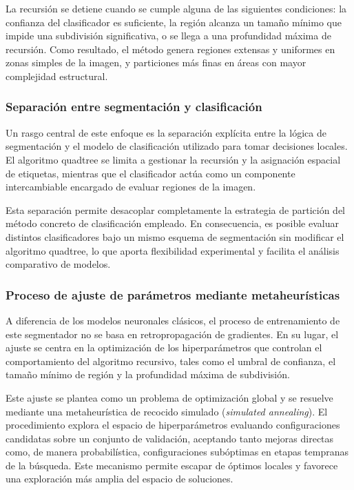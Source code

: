\documentclass[onecolumn, 12pt , journal]{IEEEtran}
\begin{document}
La recursión se detiene cuando se cumple alguna de las siguientes condiciones: la confianza del clasificador es suficiente, la región alcanza un tamaño mínimo que impide una subdivisión significativa, o se llega a una profundidad máxima de recursión. Como resultado, el método genera regiones extensas y uniformes en zonas simples de la imagen, y particiones más finas en áreas con mayor complejidad estructural.

\subsubsection{Separación entre segmentación y clasificación}

Un rasgo central de este enfoque es la separación explícita entre la lógica de segmentación y el modelo de clasificación utilizado para tomar decisiones locales. El algoritmo quadtree se limita a gestionar la recursión y la asignación espacial de etiquetas, mientras que el clasificador actúa como un componente intercambiable encargado de evaluar regiones de la imagen.

Esta separación permite desacoplar completamente la estrategia de partición del método concreto de clasificación empleado. En consecuencia, es posible evaluar distintos clasificadores bajo un mismo esquema de segmentación sin modificar el algoritmo quadtree, lo que aporta flexibilidad experimental y facilita el análisis comparativo de modelos.

\subsubsection{Proceso de ajuste de parámetros mediante metaheurísticas}

A diferencia de los modelos neuronales clásicos, el proceso de entrenamiento de este segmentador no se basa en retropropagación de gradientes. En su lugar, el ajuste se centra en la optimización de los hiperparámetros que controlan el comportamiento del algoritmo recursivo, tales como el umbral de confianza, el tamaño mínimo de región y la profundidad máxima de subdivisión.

Este ajuste se plantea como un problema de optimización global y se resuelve mediante una metaheurística de recocido simulado (\emph{simulated annealing}). El procedimiento explora el espacio de hiperparámetros evaluando configuraciones candidatas sobre un conjunto de validación, aceptando tanto mejoras directas como, de manera probabilística, configuraciones subóptimas en etapas tempranas de la búsqueda. Este mecanismo permite escapar de óptimos locales y favorece una exploración más amplia del espacio de soluciones.
\end{document}
